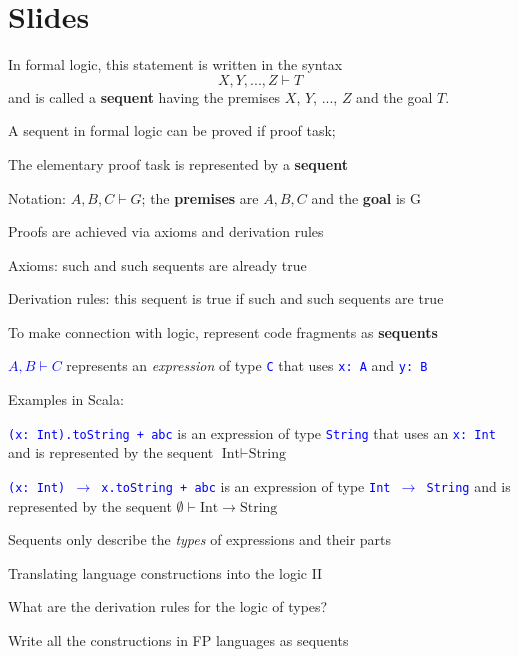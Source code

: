 \section{Slides}

In formal logic, this statement is written in the syntax
\[
X,Y,...,Z\vdash T
\]
and is called a \textbf{sequent} having
the premises $X$, $Y$, ..., $Z$ and the goal $T$.

A sequent in formal logic can be proved if proof task;

The elementary proof task is represented by a \textbf{sequent}

Notation: $A,B,C\vdash G$; the \textbf{premises} are $A,B,C$ and
the \textbf{goal} is G

Proofs are achieved via axioms and derivation rules

Axioms: such and such sequents are already true

Derivation rules: this sequent is true if such and such sequents are
true

To make connection with logic, represent code fragments as \textbf{sequents}

\textcolor{blue}{$A,B\vdash C$} represents an \emph{expression} of
type \texttt{\textcolor{blue}{\footnotesize{}C}} that uses \texttt{\textcolor{blue}{\footnotesize{}x:\ A}}
and \texttt{\textcolor{blue}{\footnotesize{}y:\ B}}{\footnotesize\par}

Examples in Scala:

\texttt{\textcolor{blue}{\footnotesize{}(x:\ Int).toString + \textquotedbl abc\textquotedbl}}
is an expression of type \texttt{\textcolor{blue}{\footnotesize{}String}}
that uses an \texttt{\textcolor{blue}{\footnotesize{}x:\ Int}} and
is represented by the sequent $\text{Int}\vdash\text{String}$

\texttt{\textcolor{blue}{\footnotesize{}(x:\ Int) $\rightarrow$
x.toString + \textquotedbl abc\textquotedbl}} is an expression
of type \texttt{\textcolor{blue}{\footnotesize{}Int $\rightarrow$
String}} and is represented by the sequent $\emptyset\vdash\text{Int}\rightarrow\text{String}$

Sequents only describe the \emph{types} of expressions and their parts

Translating language constructions into the logic II

What are the derivation rules for the logic of types?

Write all the constructions in FP languages as sequents

